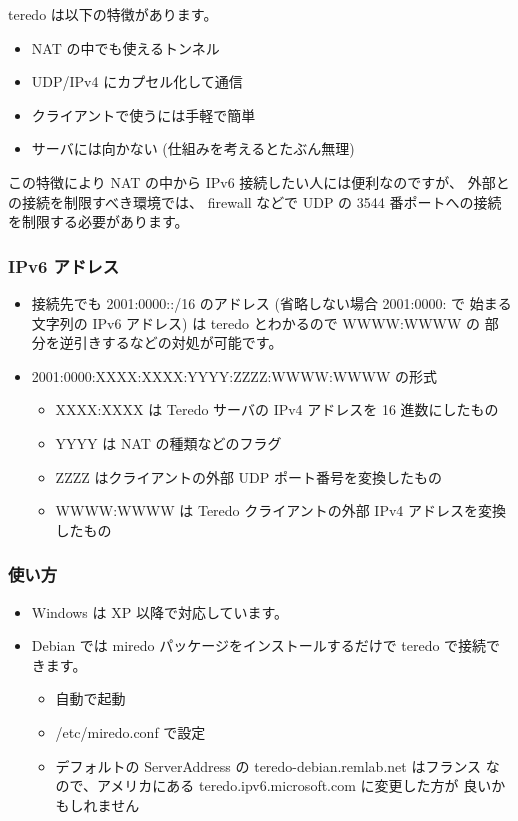 \documentclass[mingoth,a4paper]{jsarticle}
\begin{document}
teredo は以下の特徴があります。

\begin{itemize}
\item NAT の中でも使えるトンネル
\item UDP/IPv4 にカプセル化して通信
\item クライアントで使うには手軽で簡単
\item サーバには向かない (仕組みを考えるとたぶん無理)
\end{itemize}


この特徴により NAT の中から IPv6 接続したい人には便利なのですが、
外部との接続を制限すべき環境では、 firewall などで UDP の
3544 番ポートへの接続を制限する必要があります。
\subsubsection{IPv6 アドレス}


\begin{itemize}
\item 接続先でも 2001:0000::/16 のアドレス (省略しない場合 2001:0000: で
  始まる文字列の IPv6 アドレス) は teredo とわかるので WWWW:WWWW の
  部分を逆引きするなどの対処が可能です。
\item 2001:0000:XXXX:XXXX:YYYY:ZZZZ:WWWW:WWWW の形式

\begin{itemize}
\item XXXX:XXXX は Teredo サーバの IPv4 アドレスを 16 進数にしたもの
\item YYYY は NAT の種類などのフラグ
\item ZZZZ はクライアントの外部 UDP ポート番号を変換したもの
\item WWWW:WWWW は Teredo クライアントの外部 IPv4 アドレスを変換したもの
\end{itemize}

\end{itemize}
\subsubsection{使い方}


\begin{itemize}
\item Windows は XP 以降で対応しています。
\item Debian では miredo パッケージをインストールするだけで teredo で接続できます。

\begin{itemize}
\item 自動で起動
\item /etc/miredo.conf で設定
\item デフォルトの ServerAddress の teredo-debian.remlab.net はフランス
    なので、アメリカにある teredo.ipv6.microsoft.com に変更した方が
    良いかもしれません
\end{itemize}

\end{itemize}
\end{document}
